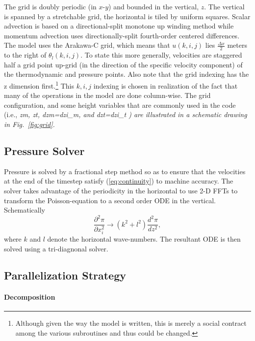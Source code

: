 \documentclass[11pt,a4paper]{article}
\begin{document}
The grid is doubly periodic (in $x$-$y$) and bounded in the vertical,
$z.$ The vertical is spanned by a stretchable grid, the horizontal is
tiled by uniform squares. Scalar advection is based on a
directional-split monotone up winding method while momentum advection
uses directionally-split fourth-order centered differences.
The model uses the Arakawa-C grid, which means that $u(k,i,j)$ lies
$\frac{\Delta x}{2} $ meters to the right of $\theta_l(k,i,j)$. To
state this more generally, velocities are staggered half a grid point
up-grid (in the direction of the specific velocity component) of the
thermodynamic and pressure points.  Also note that the grid indexing
has the z dimension first.\footnote{Although given the way the model
is written, this is merely a social contract among the various
subroutines and thus could be changed.}  This $k,i,j$ indexing is
chosen in realization of the fact that many of the operations in the
model are done column-wise.  The grid configuration, and some height
variables that are commonly used in the code (i.e., \it zm, zt, dzm=dzi\_m,
\rm and \it dzt=dzi\_t \rm) are illustrated in a schematic drawing in
Fig.~\ref{fig:grid}.

\subsection{Pressure Solver}
Pressure is solved by a fractional step method so as to ensure that
the velocities at the end of the timestep satisfy
(\ref{eq:continuity}) to machine accuracy.  The solver takes
advantage of the periodicity in the horizontal to use 2-D FFTs to
transform the Poisson-equation to a second order ODE in the
vertical. Schematically
\begin{equation}
\frac{\partial^2 \pi}{\partial x_i^2} \longrightarrow
(k^2+l^2)\frac{d^2\pi}{dz^2},
\end{equation}
where $k$ and $l$ denote the horizontal wave-numbers.  The resultant
ODE is then solved using a tri-diagnonal solver.

\subsection{Parallelization Strategy}

\paragraph{Decomposition}
\end{document}
